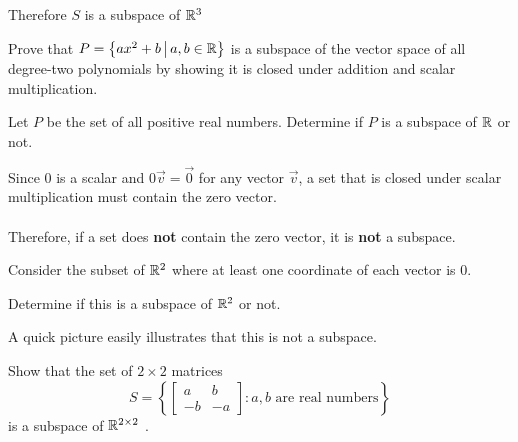 \begin{applicationActivities}
\begin{activity}{15}
Therefore \(S\) is a subspace of \(\mathbb{R}^3\)
\end{activity}

\begin{activity}{10}
  Prove that \(P=\left\{ax^2+b\,\middle|\,a,b \in \mathbb{R}\right\}\) is a subspace
  of the vector space of all degree-two polynomials by showing it is closed under addition and scalar multiplication.
\end{activity}

\begin{activity}{10}
Let \(P\) be the set of all positive real numbers.  Determine if \(P\) is a subspace of \(\mathbb{R}\) or not.
\end{activity}

\begin{remark}
Since \(0\) is a scalar and \(0\vec{v}=\vec{0}\) for any vector \(\vec{v}\), a set that is closed under scalar multiplication must contain the zero vector.
\ \\
\ \\
Therefore, if a set does {\bf not} contain the zero vector, it is {\bf not} a subspace.
\end{remark}

\begin{activity}{10}
  Consider the subset of \(\mathbb{R}^2\) where at least one coordinate of
  each vector is \(0\).
  \begin{center}
  \end{center}

Determine if this is a subspace of \(\mathbb{R}^2\) or not.

  \begin{instructorNote}
   A quick picture easily illustrates that this is not a subspace. 
  \end{instructorNote}
\end{activity}



\begin{activity}{5}
  Show that the set of \(2\times 2\) matrices
  \[S=
    \left\{
    \begin{bmatrix}a&b\\-b&-a\end{bmatrix} :
    a,b\text{ are real numbers}
    \right\}
  \]
  is a subspace of \(\mathbb{R}^{2\times 2}\) .
\end{activity}


\end{applicationActivities}
